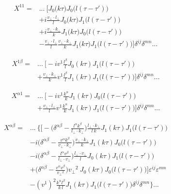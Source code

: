 \begin{equation*}
\begin{split}
 X^{11} = & ... ~ \bigg[ J_0\big(k \tau \big) J_0\big(l(\tau-\tau')\big) \\
& +i \frac{v_\perp \cdot l_\perp}{l} J_0\big(k \tau \big) J_1\big(l(\tau-\tau')\big) \\
& +i \frac{v_\perp \cdot k_\perp}{k} J_1\big(k \tau \big) J_0\big(l(\tau-\tau')\big) \\
& - \frac{v_\perp \cdot l_\perp}{l} \frac{v_\perp \cdot k_\perp}{k} J_1\big(k \tau \big) J_1\big(l(\tau-\tau')\big)
\bigg] \delta^{ij} \delta^{mn}... 
\end{split}
\end{equation*}

\begin{equation*}
\begin{split}
 X^{1 \beta} = & ...~ \bigg[ - i v^1 \frac{l^\beta}{l} J_0(k \tau) J_1\big(l(\tau-\tau') \big)    \\
& + \frac{v_\perp \cdot k_\perp}{k}  v^1 \frac{l^\beta}{l} J_1 (k\tau) J_1\big(l(\tau-\tau') \big)  \bigg] \delta^{ij} \delta^{mn} ...
\end{split}
\end{equation*}

\begin{equation*}
\begin{split}
 X^{\alpha 1} = &...~ \bigg[  - i v^1 \frac{k^\alpha}{k} J_1(k \tau) J_0\big(l(\tau-\tau')\big)   \\
& + \frac{v_\perp \cdot l_\perp}{l}  v^1 \frac{k^\alpha}{k} J_1(k\tau) J_1\big(l(\tau-\tau')\big)  \bigg] \delta^{ij} \delta^{mn}  ...
\end{split}
\end{equation*}


\begin{equation*}
\begin{split}
 X^{\alpha \beta} = & ...~ \bigg\{ \bigg[ -\Big(\delta^{\alpha \beta}  - \frac{l^\alpha k^\beta}{l_\perp \cdot k_\perp}\Big) \frac{l_\perp \cdot k_\perp}{l ~k} J_1 (k \tau) J_1\big(l(\tau-\tau')\big) \\
& -i \Big(\delta^{\alpha \beta}  - \frac{v^\alpha k^\beta}{v_\perp \cdot k_\perp}\Big) \frac{v_\perp \cdot k_\perp}{k} J_1 (k \tau) J_0\big(l(\tau-\tau')\big) \\
& -i \Big(\delta^{\alpha \beta}  - \frac{l^\alpha v^\beta}{l_\perp \cdot v_\perp}\Big) \frac{l_\perp \cdot v_\perp}{l} J_0 (k \tau) J_1\big(l(\tau-\tau')\big) \\
& + \Big(\delta^{\alpha \beta}  - \frac{v^\alpha v^\beta}{{v_\perp}^2}\Big) {v_\perp}^2 ~ J_0 (k \tau) J_0\big(l(\tau-\tau')\big) \bigg] \varepsilon^{ij} \varepsilon^{mn} \\ 
& -(v^1)^2 \frac{k^\alpha l^\beta}{k ~l} J_1 (k \tau) J_1\big(l(\tau-\tau')\big) \delta^{ij} \delta^{mn} \bigg\} ...
\end{split}
\end{equation*}

